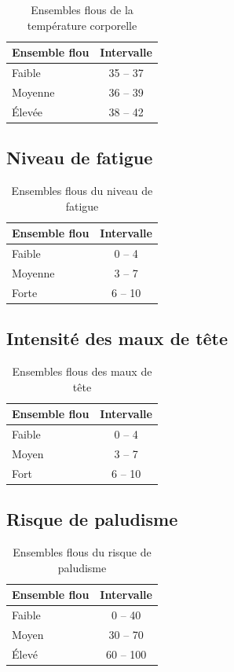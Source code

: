 \documentclass[a4paper,12pt]{report} %
\begin{document}
\begin{table}[H]
\centering
\caption{Ensembles flous de la température corporelle}
\begin{tabular}{|l|c|}
\hline
\textbf{Ensemble flou} & \textbf{Intervalle} \\
\hline
Faible & 35 – 37 \\
Moyenne & 36 – 39 \\
Élevée & 38 – 42 \\
\hline
\end{tabular}
\end{table}

\subsection{Niveau de fatigue}

\begin{table}[H]
\centering
\caption{Ensembles flous du niveau de fatigue}
\begin{tabular}{|l|c|}
\hline
\textbf{Ensemble flou} & \textbf{Intervalle} \\
\hline
Faible & 0 – 4 \\
Moyenne & 3 – 7 \\
Forte & 6 – 10 \\
\hline
\end{tabular}
\end{table}

\subsection{Intensité des maux de tête}

\begin{table}[H]
\centering
\caption{Ensembles flous des maux de tête}
\begin{tabular}{|l|c|}
\hline
\textbf{Ensemble flou} & \textbf{Intervalle} \\
\hline
Faible & 0 – 4 \\
Moyen & 3 – 7 \\
Fort & 6 – 10 \\
\hline
\end{tabular}
\end{table}

\subsection{Risque de paludisme}

\begin{table}[H]
\centering
\caption{Ensembles flous du risque de paludisme}
\begin{tabular}{|l|c|}
\hline
\textbf{Ensemble flou} & \textbf{Intervalle} \\
\hline
Faible & 0 – 40 \\
Moyen & 30 – 70 \\
Élevé & 60 – 100 \\
\hline
\end{tabular}
\end{table}
\end{document}
